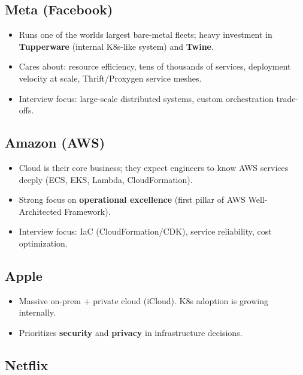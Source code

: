 \documentclass[11pt]{article}
\providecommand{\tightlist}{\setlength{\itemsep}{1pt}\setlength{\parskip}{0pt}}
\begin{document}
\subsection{Meta (Facebook)}\label{meta-facebook}

\begin{itemize}
\tightlist
\item
  Runs one of the world\textquotesingle s largest bare-metal fleets; heavy investment in \textbf{Tupperware} (internal K8s-like system) and \textbf{Twine}.
\item
  Cares about: resource efficiency, tens of thousands of services, deployment velocity at scale, Thrift/Proxygen service meshes.
\item
  Interview focus: large-scale distributed systems, custom orchestration trade-offs.
\end{itemize}

\subsection{Amazon (AWS)}\label{amazon-aws}

\begin{itemize}
\tightlist
\item
  Cloud is their core business; they expect engineers to know AWS services deeply (ECS, EKS, Lambda, CloudFormation).
\item
  Strong focus on \textbf{operational excellence} (first pillar of AWS Well-Architected Framework).
\item
  Interview focus: IaC (CloudFormation/CDK), service reliability, cost optimization.
\end{itemize}

\subsection{Apple}\label{apple}

\begin{itemize}
\tightlist
\item
  Massive on-prem + private cloud (iCloud). K8s adoption is growing internally.
\item
  Prioritizes \textbf{security} and \textbf{privacy} in infrastructure decisions.
\end{itemize}

\subsection{Netflix}\label{netflix}
\end{document}
